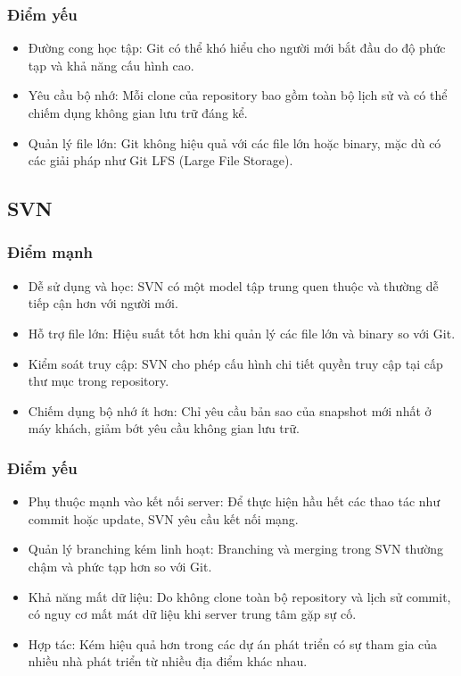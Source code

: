 \subsubsection{Điểm yếu}
\begin{itemize}
    \item Đường cong học tập: Git có thể khó hiểu cho người mới bắt đầu do độ phức tạp và khả năng cấu hình cao.
    \item Yêu cầu bộ nhớ: Mỗi clone của repository bao gồm toàn bộ lịch sử và có thể chiếm dụng không gian lưu trữ đáng kể.
    \item Quản lý file lớn: Git không hiệu quả với các file lớn hoặc binary, mặc dù có các giải pháp như Git LFS (Large File Storage).
\end{itemize}

\subsection{SVN}
\subsubsection{Điểm mạnh}
\begin{itemize}
    \item Dễ sử dụng và học: SVN có một model tập trung quen thuộc và thường dễ tiếp cận hơn với người mới.
    \item Hỗ trợ file lớn: Hiệu suất tốt hơn khi quản lý các file lớn và binary so với Git.
    \item Kiểm soát truy cập: SVN cho phép cấu hình chi tiết quyền truy cập tại cấp thư mục trong repository.
    \item Chiếm dụng bộ nhớ ít hơn: Chỉ yêu cầu bản sao của snapshot mới nhất ở máy khách, giảm bớt yêu cầu không gian lưu trữ.
\end{itemize}

\subsubsection{Điểm yếu}
\begin{itemize}
    \item Phụ thuộc mạnh vào kết nối server: Để thực hiện hầu hết các thao tác như commit hoặc update, SVN yêu cầu kết nối mạng.
    \item Quản lý branching kém linh hoạt: Branching và merging trong SVN thường chậm và phức tạp hơn so với Git.
    \item Khả năng mất dữ liệu: Do không clone toàn bộ repository và lịch sử commit, có nguy cơ mất mát dữ liệu khi server trung tâm gặp sự cố.
    \item Hợp tác: Kém hiệu quả hơn trong các dự án phát triển có sự tham gia của nhiều nhà phát triển từ nhiều địa điểm khác nhau.
\end{itemize}
